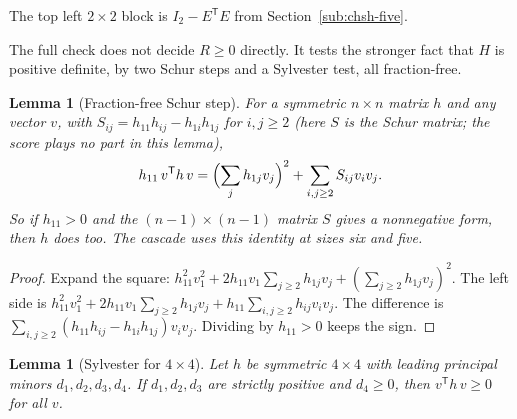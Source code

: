 \documentclass[11pt,twoside]{article}
\theoremstyle{thielethm}
\newtheorem{lemma}[theorem]{Lemma}
\theoremstyle{thieledef}
\theoremstyle{thieledef}
\theoremstyle{thieledef}
\theoremstyle{thielethm}
\theoremstyle{thieleobs}
\theoremstyle{thielethm}
\begin{document}
The top left $2 \times 2$ block is $I_2 - E^{\mathsf T} E$ from Section~\ref{sub:chsh-five}.

The full check does not decide $R \ge 0$ directly. It tests the stronger fact that $H$ is
positive definite, by two Schur steps and a Sylvester test, all fraction-free.

\begin{lemma}[Fraction-free Schur step]\label{lem:chsh-schur-step}
For a symmetric $n \times n$ matrix $h$ and any vector $v$, with
$S_{ij} = h_{11} h_{ij} - h_{1i} h_{1j}$ for $i, j \ge 2$ (here $S$ is the Schur matrix;
the score plays no part
in this lemma),
\[
h_{11} \, v^{\mathsf T} h\, v = \Bigl(\sum_{j} h_{1j} v_j\Bigr)^2 + \sum_{i,j \ge 2} S_{ij} v_i v_j.
\]
So if $h_{11} > 0$ and the $(n-1) \times (n-1)$ matrix $S$ gives a nonnegative form, then $h$
does too. The cascade uses this identity at sizes six and five.
\end{lemma}

\begin{proof}
Expand the square: $h_{11}^2 v_1^2 + 2 h_{11} v_1 \sum_{j \ge 2} h_{1j} v_j +
(\sum_{j \ge 2} h_{1j} v_j)^2$. The left side is
$h_{11}^2 v_1^2 + 2 h_{11} v_1 \sum_{j \ge 2} h_{1j} v_j + h_{11} \sum_{i,j \ge 2} h_{ij} v_i v_j$.
The difference is $\sum_{i,j \ge 2} (h_{11} h_{ij} - h_{1i} h_{1j}) v_i v_j$. Dividing by
$h_{11} > 0$ keeps the sign.
\end{proof}

\begin{lemma}[Sylvester for $4\times4$]\label{lem:chsh-sylvester}
Let $h$ be symmetric $4 \times 4$ with leading principal
minors $d_1, d_2, d_3, d_4$. If $d_1, d_2, d_3$ are strictly positive and $d_4 \ge 0$, then $v^{\mathsf T} h\, v \ge 0$ for all $v$.
\end{lemma}
\end{document}
